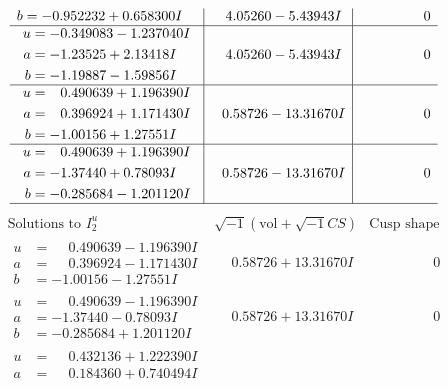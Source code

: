 \documentclass[1p]{elsarticle_modified}
\theoremstyle{definition}
\newcommand{\I}{\sqrt{-1}}
\begin{document}
$$\begin{array}{c|c|c}
\begin{aligned}
b &= -0.952232 + 0.658300 I\end{aligned}
 & \phantom{-}4.05260 - 5.43943 I & \phantom{-0.000000 } 0 \\ \hline\begin{aligned}
u &= -0.349083 - 1.237040 I \\
a &= -1.23525 + 2.13418 I \\
b &= -1.19887 - 1.59856 I\end{aligned}
 & \phantom{-}4.05260 - 5.43943 I & \phantom{-0.000000 } 0 \\ \hline\begin{aligned}
u &= \phantom{-}0.490639 + 1.196390 I \\
a &= \phantom{-}0.396924 + 1.171430 I \\
b &= -1.00156 + 1.27551 I\end{aligned}
 & \phantom{-}0.58726 - 13.31670 I & \phantom{-0.000000 } 0 \\ \hline\begin{aligned}
u &= \phantom{-}0.490639 + 1.196390 I \\
a &= -1.37440 + 0.78093 I \\
b &= -0.285684 - 1.201120 I\end{aligned}
 & \phantom{-}0.58726 - 13.31670 I & \phantom{-0.000000 } 0\\
 \hline 
 \end{array}$$\newpage$$\begin{array}{c|c|c}  
\text{Solutions to }I^u_{2}& \I (\text{vol} + \sqrt{-1}CS) & \text{Cusp shape}\\
 \hline 
\begin{aligned}
u &= \phantom{-}0.490639 - 1.196390 I \\
a &= \phantom{-}0.396924 - 1.171430 I \\
b &= -1.00156 - 1.27551 I\end{aligned}
 & \phantom{-}0.58726 + 13.31670 I & \phantom{-0.000000 } 0 \\ \hline\begin{aligned}
u &= \phantom{-}0.490639 - 1.196390 I \\
a &= -1.37440 - 0.78093 I \\
b &= -0.285684 + 1.201120 I\end{aligned}
 & \phantom{-}0.58726 + 13.31670 I & \phantom{-0.000000 } 0 \\ \hline\begin{aligned}
u &= \phantom{-}0.432136 + 1.222390 I \\
a &= \phantom{-}0.184360 + 0.740494 I \\

\end{aligned}
\end{array}$$
\end{document}
